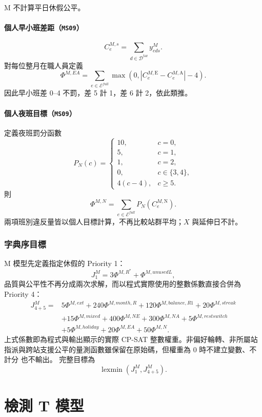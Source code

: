 \documentclass[a4paper,12pt]{article}
\begin{document}
M 不計算平日休假公平。

\paragraph{個人早小班差距（\texttt{MS09}）}
\[
  C^{M,s}_e=\sum_{d\in\mathcal{D}^{\mathrm{tar}}}y^{M}_{eds}.
\]
對每位整月在職人員定義
\[
  \Phi^{M,EA}
  =\sum_{e\in\mathcal E^{full}}
  \max\left(0,\left|C^{M,\mathrm E}_e-C^{M,\mathrm A}_e\right|-4\right).
\]
因此早小班差 0--4 不罰，差 5 計 1，差 6 計 2，依此類推。

\paragraph{個人夜班目標（\texttt{MS09}）}
定義夜班罰分函數
\[
  P_N(c)=
  \begin{cases}
    10,&c=0,\\
    5,&c=1,\\
    1,&c=2,\\
    0,&c\in\{3,4\},\\
    4(c-4),&c\geq5.
  \end{cases}
\]
則
\[
  \Phi^{M,N}=\sum_{e\in\mathcal E^{full}}P_N(C^{M,\mathrm N}_e).
\]
兩項班別違反量皆以個人目標計算，不再比較站群平均；\(X\) 與延伸日不計。

\subsubsection{字典序目標}

M 模型先定義指定休假的 Priority 1：
\[
  J^M_1=3\Phi^{M,R^*}+\Phi^{M,unusedL},
\]
品質與公平性不再分成兩次求解，而以程式實際使用的整數係數直接合併為 Priority 4：
\[
  \begin{aligned}
    J^M_{4+5}={}&
    5\Phi^{M,ext}
    +240\Phi^{M,month,R}
    +120\Phi^{M,balance,R1}
    +20\Phi^{M,streak}\\
    &+15\Phi^{M,mixed}
    +400\Phi^{M,NE}
    +300\Phi^{M,NA}
    +5\Phi^{M,restswitch}\\
    &+5\Phi^{M,holiday}
    +20\Phi^{M,EA}
    +50\Phi^{M,N}.
  \end{aligned}
\]
上式係數即為程式與輸出顯示的實際 CP-SAT 整數權重。非偏好輪轉、非所屬站
指派與跨站支援公平的量測函數雖保留在原始碼，但權重為 0 時不建立變數、不計分
也不輸出。
完整目標為
\[
  \operatorname{lexmin}
  \left(J^M_1,J^M_{4+5}\right).
\]

\section{檢測 T 模型}
\end{document}
